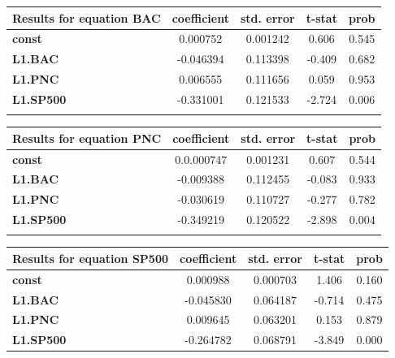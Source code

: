 \documentclass[a4paper, 11pt]{article}
\begin{document}
\begin{tabular}{lcccc}
\textbf{Results for equation BAC}             & \textbf{coefficient} & \textbf{std. error} & \textbf{t-stat} & \textbf{prob} \\
\midrule
\textbf{const} &      0.000752  &        0.001242     &    0.606  &         0.545           \\
\textbf{L1.BAC}   &       -0.046394 &        0.113398      &   -0.409  &         0.682         \\
\textbf{L1.PNC}   &       0.006555  &        0.111656     &   0.059  &         0.953         \\
\textbf{L1.SP500}   &       -0.331001  &        0.121533     &   -2.724  &         0.006         \\
\bottomrule
\\
\end{tabular}

\begin{tabular}{lcccc}
\textbf{Results for equation PNC}              & \textbf{coefficient} & \textbf{std. error} & \textbf{t-stat} & \textbf{prob} \\
\midrule
\textbf{const} &      0.0.000747  &        0.001231     &    0.607  &         0.544           \\
\textbf{L1.BAC}   &      -0.009388  &        0.112455      &   -0.083  &         0.933         \\
\textbf{L1.PNC}   &        -0.030619  &        0.110727     &   -0.277  &         0.782         \\
\textbf{L1.SP500}   &       -0.349219   &        0.120522     &   -2.898  &         0.004         \\
\bottomrule
\\
\end{tabular}

\begin{tabular}{lcccc}
\textbf{Results for equation SP500}             & \textbf{coefficient} & \textbf{std. error} & \textbf{t-stat} & \textbf{prob} \\
\midrule
\textbf{const} &      0.000988  &        0.000703     &    1.406  &         0.160           \\
\textbf{L1.BAC}   &      -0.045830  &        0.064187      &  -0.714  &         0.475        \\
\textbf{L1.PNC}   &        0.009645  &        0.063201     &   0.153  &         0.879         \\
\textbf{L1.SP500}   &       -0.264782    &        0.068791     &   -3.849  &         0.000         \\
\bottomrule
\end{tabular}
\end{document}
